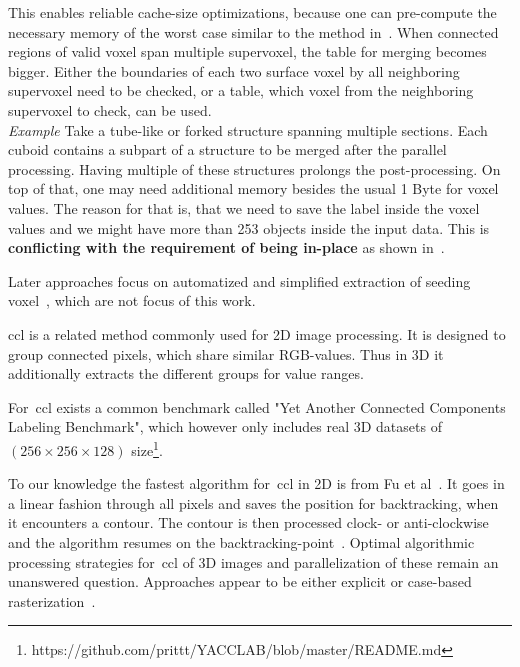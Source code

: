 \documentclass{article}
\begin{document}
This enables reliable cache-size optimizations, because one can pre-compute the necessary memory of the worst case similar to the method in~.
When connected regions of valid voxel span multiple supervoxel, the table for merging becomes bigger.
Either the boundaries of each two surface voxel by all neighboring supervoxel need to be checked, or a table, which voxel from the neighboring supervoxel to check, can be used.\\
\textit{Example} Take a tube-like or forked structure spanning multiple sections.
Each cuboid contains a subpart of a structure to be merged after the parallel processing.
Having multiple of these structures prolongs the post-processing.
On top of that, one may need additional memory besides the usual 1 Byte for voxel values.
The reason for that is, that we need to save the label inside the voxel values and we might have more than 253 objects inside the input data.
This is \textbf{conflicting with the requirement of being in-place} as shown in~.\par
Later approaches focus on automatized and simplified extraction of seeding voxel~\cite{2018melouah}, which are not focus of this work.\par
\Ac{ccl} is a related method commonly used for 2D image processing.
It is designed to group connected pixels, which share similar RGB-values.
Thus in 3D it additionally extracts the different groups for value ranges.\par
For~\ac{ccl} exists a common benchmark called "Yet Another Connected Components Labeling Benchmark", which however only includes real 3D datasets of $(256\times 256\times 128)$ size\footnote{https://github.com/prittt/YACCLAB/blob/master/README.md}.\par
To our knowledge the fastest algorithm for~\ac{ccl} in 2D is from Fu et al~\cite{2017he}.
It goes in a linear fashion through all pixels and saves the position for backtracking, when it encounters a contour.
The contour is then processed clock- or anti-clockwise and the algorithm resumes on the backtracking-point~\cite{2004chang}.
Optimal algorithmic processing strategies for~\ac{ccl} of 3D images and parallelization of these remain an unanswered question.
Approaches appear to be either explicit or case-based rasterization~\cite{2017he}.\par
\end{document}
